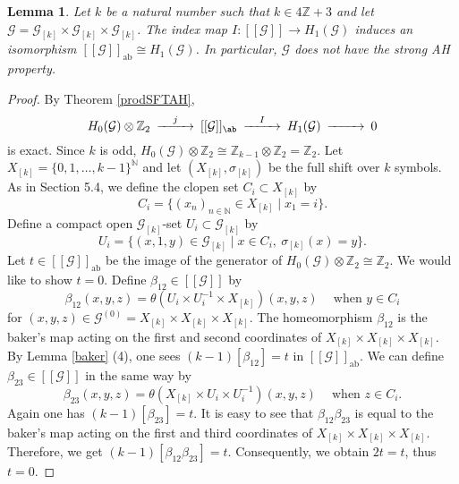 \documentclass[11pt]{article}
\newtheorem{lemma}[theorem]{Lemma}
\theoremstyle{definition}
\numberwithin{equation}{section}
\newcommand{\ab}{\mathrm{ab}}
\newcommand{\G}{\mathcal{G}}
\newcommand{\N}{\mathbb{N}}
\newcommand{\Z}{\mathbb{Z}}
\begin{document}
\begin{lemma}\label{tauiszero}
Let $k$ be a natural number such that $k\in4\Z{+}3$ and 
let $\G=\G_{[k]}\times\G_{[k]}\times\G_{[k]}$. 
The index map $I:[[\G]]\to H_1(\G)$ induces 
an isomorphism $[[\G]]_\ab\cong H_1(\G)$. 
In particular, $\G$ does not have the strong AH property. 
\end{lemma}
\begin{proof}
By Theorem \ref{prodSFTAH}, 
\[
\begin{CD}
H_0(\G)\otimes\Z_2@>j>>[[\G]]_\ab@>I>>H_1(\G)@>>>0
\end{CD}
\]
is exact. 
Since $k$ is odd, $H_0(\G)\otimes\Z_2\cong\Z_{k-1}\otimes\Z_2=\Z_2$. 
Let $X_{[k]}=\{0,1,\dots,k{-}1\}^\N$ and 
let $(X_{[k]},\sigma_{[k]})$ be the full shift over $k$ symbols. 
As in Section 5.4, 
we define the clopen set $C_i\subset X_{[k]}$ by 
\[
C_i=\{(x_n)_{n\in\N}\in X_{[k]}\mid x_1=i\}. 
\]
Define a compact open $\G_{[k]}$-set $U_i\subset\G_{[k]}$ by 
\[
U_i=\{(x,1,y)\in\G_{[k]}\mid x\in C_i,\ \sigma_{[k]}(x)=y\}. 
\]
Let $t\in[[\G]]_\ab$ be the image of 
the generator of $H_0(\G)\otimes\Z_2\cong\Z_2$. 
We would like to show $t=0$. 
Define $\beta_{12}\in[[\G]]$ by 
\[
\beta_{12}(x,y,z)=
\theta(U_i\times U_i^{-1}\times X_{[k]})(x,y,z)\
\quad\text{when $y\in C_i$}
\]
for $(x,y,z)\in\G^{(0)}=X_{[k]}\times X_{[k]}\times X_{[k]}$. 
The homeomorphism $\beta_{12}$ is the baker's map 
acting on the first and second coordinates of 
$X_{[k]}\times X_{[k]}\times X_{[k]}$. 
By Lemma \ref{baker} (4), 
one sees $(k{-}1)[\beta_{12}]=t$ in $[[\G]]_\ab$. 
We can define $\beta_{23}\in[[\G]]$ in the same way by 
\[
\beta_{23}(x,y,z)=
\theta(X_{[k]}\times U_i\times U_i^{-1})(x,y,z)\
\quad\text{when $z\in C_i$}. 
\]
Again one has $(k{-}1)[\beta_{23}]=t$. 
It is easy to see that 
$\beta_{12}\beta_{23}$ is equal to the baker's map 
acting on the first and third coordinates of 
$X_{[k]}\times X_{[k]}\times X_{[k]}$. 
Therefore, we get $(k{-}1)[\beta_{12}\beta_{23}]=t$. 
Consequently, we obtain $2t=t$, thus $t=0$. 
\end{proof}
\end{document}
